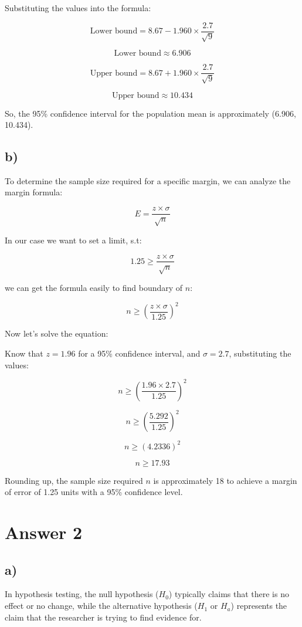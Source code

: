 \documentclass[12pt]{article}
\begin{document}
Substituting the values into the formula:

\[ \text{Lower bound} = 8.67 - 1.960 \times \frac{2.7}{\sqrt{9}} \]

\[ \text{Lower bound} \approx 6.906 \]

\[ \text{Upper bound} = 8.67 + 1.960 \times \frac{2.7}{\sqrt{9}} \]

\[ \text{Upper bound} \approx 10.434 \]

So, the 95\% confidence interval for the population mean is approximately (6.906, 10.434).

\subsection*{b)} 

To determine the sample size required for a specific margin, we can analyze the margin formula:

\[ {E} = \frac{z \times \sigma}{\sqrt{n}}\]

In our case we want to set a limit, s.t:

\[ {1.25} \geq \frac{z \times \sigma}{\sqrt{n}}\]

we can get the formula easily to find boundary of $n$:

\[ n \geq \left( \frac{z \times \sigma}{1.25} \right)^2 \]

Now let's solve the equation:

Know that \(z = 1.96\) for a 95\% confidence interval, and \(\sigma = 2.7\), substituting the values:

\[ n \geq \left( \frac{1.96 \times 2.7}{1.25} \right)^2 \]

\[ n \geq \left( \frac{5.292}{1.25} \right)^2 \]

\[ n \geq \left( 4.2336 \right)^2 \]

\[ n \geq 17.93 \]

Rounding up, the sample size required $n$ is approximately 18 to achieve a margin of error of 1.25 units with a 95\% confidence level.

\section*{Answer 2}

\subsection*{a)} 

In hypothesis testing, the null hypothesis (\(H_0\)) typically claims that there is no effect or no change, while the alternative hypothesis (\(H_1\) or \(H_a\)) represents the claim that the researcher is trying to find evidence for.
\end{document}
